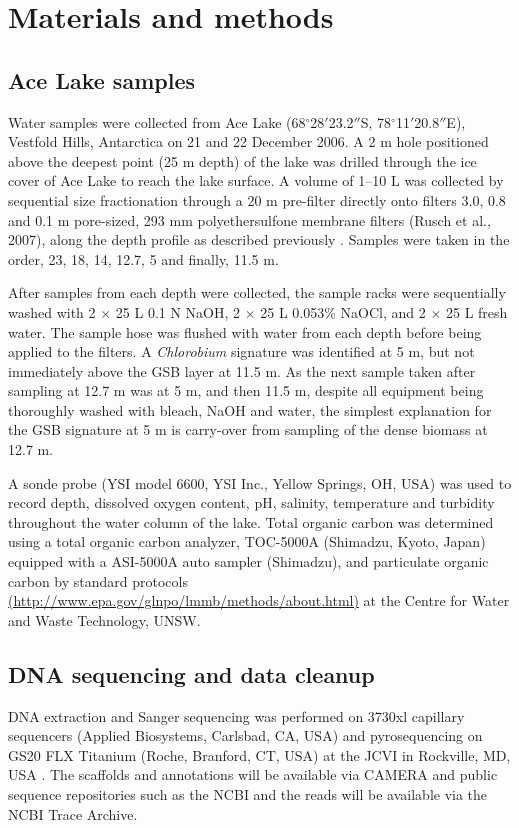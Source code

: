 
\section{Materials and methods}
\label{ch:mm}
\subsection{Ace Lake samples}
Water samples were collected from Ace Lake (68$^{\circ}$28$'$23.2$''$S, 78$^{\circ}$11$'$20.8$''$E), Vestfold Hills, Antarctica on 21 and 22 December 2006. 
A 2 m hole positioned above the deepest point (25 m depth) of the lake was drilled through the ice cover of Ace Lake to reach the lake surface.
A volume of 1--10 L was collected by sequential size fractionation through a 20 \textmu{}m pre-filter directly onto filters 3.0, 0.8 and 0.1 \textmu{}m pore-sized, 293 mm polyethersulfone membrane filters (Rusch et al., 2007), along the depth profile as described previously \cite{Ng2010a}.
Samples were taken in the order, 23, 18, 14, 12.7, 5 and finally, 11.5 m.

After samples from each depth were collected, the sample racks were sequentially washed with 2 $\times$ 25 L 0.1 N NaOH, 2 $\times$ 25 L 0.053\% NaOCl, and 2 $\times$ 25 L fresh water. 
The sample hose was flushed with water from each depth before being applied to the filters. 
A \emph{Chlorobium} signature was identified at 5 m, but not immediately above the \ac{GSB} layer at 11.5 m. 
As the next sample taken after sampling at 12.7 m was at 5 m, and then 11.5 m, despite all equipment being thoroughly washed with bleach, NaOH and water, 
the simplest explanation for the \ac{GSB} signature at 5 m is carry-over from sampling of the dense biomass at 12.7 m. 

A sonde probe (YSI model 6600, YSI Inc., Yellow Springs, OH, USA) was used to record depth, dissolved oxygen content, pH, salinity, temperature and turbidity throughout the water column of the lake. 
Total organic carbon was determined using a total organic carbon analyzer, TOC-5000A (Shimadzu, Kyoto, Japan) equipped with a ASI-5000A auto sampler (Shimadzu), and particulate organic carbon by standard protocols 
\url{(http://www.epa.gov/glnpo/lmmb/methods/about.html)} 
at the Centre for Water and Waste Technology, UNSW.

\subsection{DNA sequencing and data cleanup}
DNA extraction and Sanger sequencing was performed on 3730xl capillary sequencers (Applied Biosystems, Carlsbad, CA, USA) and pyrosequencing on GS20 FLX Titanium (Roche, Branford, CT, USA) at the \acl{JCVI} in Rockville, MD, USA \cite{Rusch2007}. 
The scaffolds and annotations will be available via \ac{CAMERA} and public sequence repositories such as the \ac{NCBI} and the reads will be available via the \ac{NCBI} Trace Archive. 

